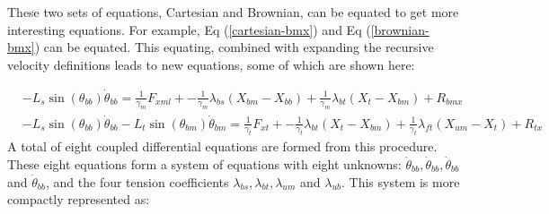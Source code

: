 \documentclass[9pt,twoside,lineno]{pnas-new}
\begin{document}
These two sets of equations, Cartesian and Brownian, can be equated to get more interesting equations. For example, Eq (\ref{cartesian-bmx}) and Eq (\ref{brownian-bmx}) can be equated. This equating, combined with expanding the recursive velocity definitions leads to new equations, some of which are shown here:

\begin{align}
  &-L_s\sin(\theta_{bb})\dot{\theta}_{bb} = \frac{1}{\gamma_m}F_{xml} + -\frac{1}{\gamma_m}\lambda_{bs}(X_{bm} - X_{bb}) + \frac{1}{\gamma_m}\lambda_{bt}(X_{t } - X_{bm}) + R_{bmx} \label{ob_system_first}\\
  &-L_s\sin(\theta_{bb})\dot{\theta}_{bb} - L_t\sin(\theta_{bm})\dot{\theta}_{bm} = \frac{1}{\gamma_t}F_{xt } + -\frac{1}{\gamma_t}\lambda_{bt}(X_{t } - X_{bm}) + \frac{1}{\gamma_t}\lambda_{ft}(X_{um} - X_{t }) + R_{tx}\label{ob_system_second}
\end{align}
%
A total of eight coupled differential equations are formed from this procedure. These eight equations form a system of equations with eight unknowns: $\dot{\theta}_{bb}, \dot{\theta}_{bb}, \dot{\theta}_{bb}$ and $\dot{\theta}_{bb}$, and the four tension coefficients $\lambda_{bs}, \lambda_{bt}, \lambda_{um}$ and $\lambda_{ub}$. This system is more compactly represented as:
\end{document}

